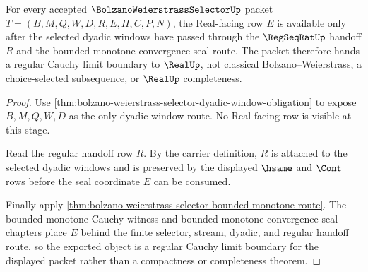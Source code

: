 \begin{theorem}
\label{thm:bolzano-weierstrass-selector-regular-cauchy-limit-handoff}
For every accepted $\BolzanoWeierstrassSelectorUp$ packet $T=(B,M,Q,W,D,R,E,H,C,P,N)$, the Real-facing row $E$ is available only after the selected dyadic windows have passed through the $\RegSeqRatUp$ handoff $R$ and the bounded monotone convergence seal route. The packet therefore hands a regular Cauchy limit boundary to $\RealUp$, not classical Bolzano--Weierstrass, a choice-selected subsequence, or $\RealUp$ completeness.
\end{theorem}
\begin{proof}
Use \autoref{thm:bolzano-weierstrass-selector-dyadic-window-obligation} to expose $B,M,Q,W,D$ as the only dyadic-window route. No Real-facing row is visible at this stage.

Read the regular handoff row $R$. By the carrier definition, $R$ is attached to the selected dyadic windows and is preserved by the displayed $\hsame$ and $\Cont$ rows before the seal coordinate $E$ can be consumed.

Finally apply \autoref{thm:bolzano-weierstrass-selector-bounded-monotone-route}. The bounded monotone Cauchy witness and bounded monotone convergence seal chapters place $E$ behind the finite selector, stream, dyadic, and regular handoff route, so the exported object is a regular Cauchy limit boundary for the displayed packet rather than a compactness or completeness theorem.
\end{proof}

